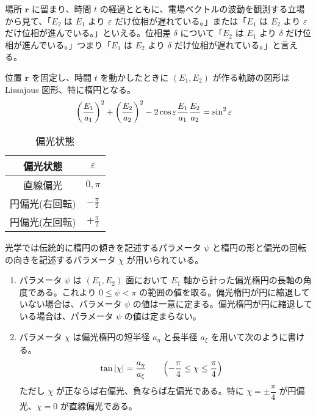 \documentclass[uplatex,dvipdfmx,a4paper,11pt]{jlreq}
\newcommand{\rr}{\bm{r}}
\theoremstyle{definition}
\begin{document}
\begin{proposition}
  場所 $\rr$ に留まり、時間 $t$ の経過とともに、電場ベクトルの波動を観測する立場から見て、「$E_2$ は $E_1$ より $\varepsilon$ だけ位相が遅れている。」または「$E_1$ は $E_2$ より $\varepsilon$ だけ位相が進んでいる。」といえる。位相差 $\delta$ について「$E_2$ は $E_1$ より $\delta$ だけ位相が進んでいる。」つまり「$E_1$ は $E_2$ より $\delta$ だけ位相が遅れている。」と言える。
\end{proposition}

\begin{proposition}
  位置 $\rr$ を固定し、時間 $t$ を動かしたときに $(E_1, E_2)$ が作る軌跡の図形は Lissajous 図形、特に楕円となる。
  \begin{align}
    \qty(\frac{E_1}{a_1})^2 + \qty(\frac{E_2}{a_2})^2 - 2\cos\varepsilon\frac{E_1}{a_1}\frac{E_2}{a_2} & = \sin^2{\varepsilon}
  \end{align}
\end{proposition}

\begin{table}[hbtp]
  \centering
  \begin{tabular}{|c|c|}
    \hline
    偏光状態     & $\varepsilon$    \\
    \hline \hline
    直線偏光     & $0, \pi$         \\
    円偏光(右回転) & $-\frac{\pi}{2}$ \\
    円偏光(左回転) & $+\frac{\pi}{2}$ \\
    \hline
  \end{tabular}
  \caption{偏光状態}
\end{table}

\begin{definition}
  光学では伝統的に楕円の傾きを記述するパラメータ $\psi$ と楕円の形と偏光の回転の向きを記述するパラメータ $\chi$ が用いられている。
  \begin{enumerate}
    \item パラメータ $\psi$ は $(E_1, E_2)$ 面において $E_1$ 軸から計った偏光楕円の長軸の角度である。これより $0 \leq \psi < \pi$ の範囲の値を取る。偏光楕円が円に縮退していない場合は、パラメータ $\psi$ の値は一意に定まる。偏光楕円が円に縮退している場合は、パラメータ $\psi$ の値は定まらない。
    \item パラメータ $\chi$ は偏光楕円の短半径 $a_\eta$ と長半径 $a_\xi$ を用いて次のように書ける。
          \begin{align}
            \tan|\chi| & = \frac{a_\eta}{a_\xi} \qquad \qty(-\frac{\pi}{4}\leq\chi\leq\frac{\pi}{4})
          \end{align}
          ただし $\chi$ が正ならば右偏光、負ならば左偏光である。特に $\chi = \pm\dfrac{\pi}{4}$ が円偏光、$\chi = 0$ が直線偏光である。
  \end{enumerate}
\end{definition}
\end{document}
